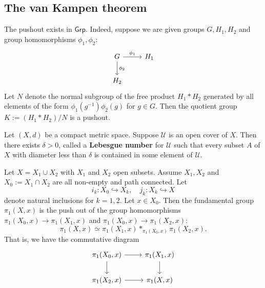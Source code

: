 \subsection{The van Kampen theorem}
\begin{proposition}
The pushout exists in $\mathsf{Grp}$. Indeed, suppose we are given groups $G,H_1,H_2$ and group homomorphisms $\phi_1,\phi_2$:
\[\begin{tikzcd}
G\ar[r,"\phi_1"]\ar[d,"\phi_2"]&H_1\\
H_2
\end{tikzcd}\]
Let $N$ denote the normal subgroup of the free product $H_1\ast H_2$ generated by all elements of the form $\phi_1(g^{-1})\phi_2(g)$ for $g\in G$. Then the quotient group $K:=(H_1\ast H_2)/N$ is a pushout.
\end{proposition}
\begin{lemma}\label{Lebesgue lem}
Let $(X,d)$ be a compact metric space. Suppose $\mathcal{U}$ is an open cover of $X$. Then there exists $\delta>0$, called a \textbf{Lebesgue number} for $\mathcal{U}$ such that every subset $A$ of $X$ with diameter less than $\delta$ is contained in some element of $\mathcal{U}$.
\end{lemma}
\begin{theorem}\label{van kampen classic}
Let $X=X_1\cup X_2$ with $X_1$ and $X_2$ open subsets. Assume $X_1,X_2$ and $X_0:=X_1\cap X_2$ are all non-empty and path connected. Let
\[i_k:X_0\hookrightarrow X_k,\quad j_k:X_k\hookrightarrow X\]
denote natural inclusions for $k=1,2$. Let $x\in X_0$. Then the fundamental group $\pi_1(X,x)$ is the push out of the group homomorphisms $\pi_1(X_0,x)\to\pi_1(X_1,x)$ and $\pi_1(X_0,x)\to\pi_1(X_2,x)$:
\[\pi_1(X,x)\simeq \pi_1(X_1,x)\ast_{\pi_1(X_0,x)}\pi_1(X_2,x).\]
That is, we have the commutative diagram
\[\begin{tikzcd}
\pi_1(X_0,x)\ar[r]\ar[d]&\pi_1(X_1,x)\ar[d]\\
\pi_1(X_2,x)\ar[r]&\pi_1(X,x)
\end{tikzcd}\]
\end{theorem}
